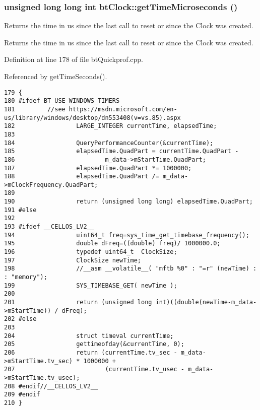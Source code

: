 \hypertarget{classbt_clock_a58b76bfde0b0f3f33d0cb91ec6b6938}{
\subsubsection[getTimeMicroseconds]{\setlength{\rightskip}{0pt plus 5cm}unsigned long long int btClock::getTimeMicroseconds ()}}
\label{classbt_clock_a58b76bfde0b0f3f33d0cb91ec6b6938}


Returns the time in us since the last call to reset or since the Clock was created.

Returns the time in us since the last call to reset or since the Clock was created. 

Definition at line 178 of file btQuickprof.cpp.

Referenced by getTimeSeconds().

\begin{Code}\begin{verbatim}179 {
180 #ifdef BT_USE_WINDOWS_TIMERS
181         //see https://msdn.microsoft.com/en-us/library/windows/desktop/dn553408(v=vs.85).aspx   
182                 LARGE_INTEGER currentTime, elapsedTime;
183                 
184                 QueryPerformanceCounter(&currentTime);
185                 elapsedTime.QuadPart = currentTime.QuadPart - 
186                         m_data->mStartTime.QuadPart;
187                 elapsedTime.QuadPart *= 1000000;
188                 elapsedTime.QuadPart /= m_data->mClockFrequency.QuadPart;
189 
190                 return (unsigned long long) elapsedTime.QuadPart;
191 #else
192 
193 #ifdef __CELLOS_LV2__
194                 uint64_t freq=sys_time_get_timebase_frequency();
195                 double dFreq=((double) freq)/ 1000000.0;
196                 typedef uint64_t  ClockSize;
197                 ClockSize newTime;
198                 //__asm __volatile__( "mftb %0" : "=r" (newTime) : : "memory");
199                 SYS_TIMEBASE_GET( newTime );
200 
201                 return (unsigned long int)((double(newTime-m_data->mStartTime)) / dFreq);
202 #else
203 
204                 struct timeval currentTime;
205                 gettimeofday(&currentTime, 0);
206                 return (currentTime.tv_sec - m_data->mStartTime.tv_sec) * 1000000 +
207                         (currentTime.tv_usec - m_data->mStartTime.tv_usec);
208 #endif//__CELLOS_LV2__
209 #endif
210 }
\end{verbatim}
\end{Code}




